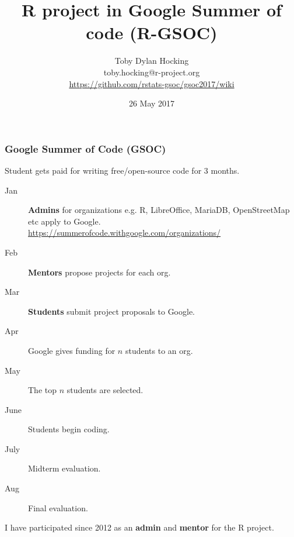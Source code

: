 \documentclass{beamer}
\begin{document}
\title{R project in Google Summer of code (R-GSOC)}

\author{
  Toby Dylan Hocking\\
  toby.hocking@r-project.org\\
\url{https://github.com/rstats-gsoc/gsoc2017/wiki}}

\date{26 May 2017}

\maketitle

\begin{frame}
  \frametitle{Google Summer of Code (GSOC)}
  Student gets paid for writing free/open-source code for 3 months.
  \begin{description}
  \item[Jan] \textbf{Admins} for organizations e.g. R,
    LibreOffice, MariaDB, OpenStreetMap etc apply to Google.\\
    \url{https://summerofcode.withgoogle.com/organizations/}
  \item[Feb] \textbf{Mentors} propose projects for each org.
  \item[Mar]\textbf{Students} submit project proposals to Google.
  \item[Apr] Google gives funding for $n$ students to an org.
  \item[May] The top $n$ students are selected.
  \item[June] Students begin coding.
  \item[July] Midterm evaluation.
  \item[Aug] Final evaluation.
  \end{description}

  I have participated since 2012 as an \textbf{admin} and
  \textbf{mentor} for the R project.
\end{frame}

\end{document}
